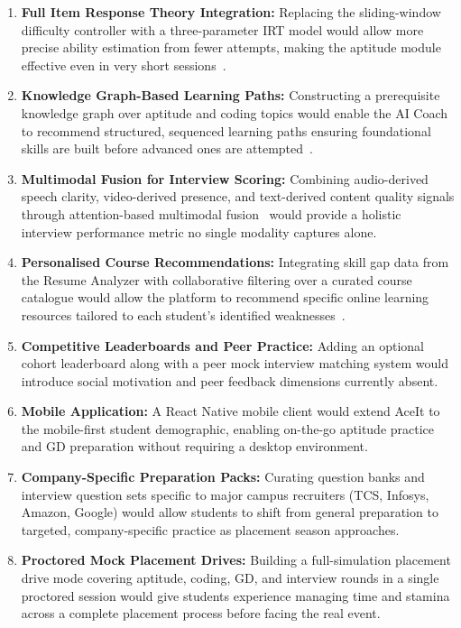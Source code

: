 \documentclass[12pt,a4paper]{report}
\begin{document}
\begin{enumerate}[leftmargin=0.5in, label=\arabic*., topsep=4pt, itemsep=3pt]
    \item \textbf{Full Item Response Theory Integration:} Replacing the sliding-window difficulty controller with a three-parameter IRT model would allow more precise ability estimation from fewer attempts, making the aptitude module effective even in very short sessions~\cite{ref1}.

    \item \textbf{Knowledge Graph-Based Learning Paths:} Constructing a prerequisite knowledge graph over aptitude and coding topics would enable the AI Coach to recommend structured, sequenced learning paths ensuring foundational skills are built before advanced ones are attempted~\cite{ref18}.

    \item \textbf{Multimodal Fusion for Interview Scoring:} Combining audio-derived speech clarity, video-derived presence, and text-derived content quality signals through attention-based multimodal fusion~\cite{ref17} would provide a holistic interview performance metric no single modality captures alone.

    \item \textbf{Personalised Course Recommendations:} Integrating skill gap data from the Resume Analyzer with collaborative filtering over a curated course catalogue would allow the platform to recommend specific online learning resources tailored to each student's identified weaknesses~\cite{ref14}.

    \item \textbf{Competitive Leaderboards and Peer Practice:} Adding an optional cohort leaderboard along with a peer mock interview matching system would introduce social motivation and peer feedback dimensions currently absent.

    \item \textbf{Mobile Application:} A React Native mobile client would extend AceIt to the mobile-first student demographic, enabling on-the-go aptitude practice and GD preparation without requiring a desktop environment.

    \item \textbf{Company-Specific Preparation Packs:} Curating question banks and interview question sets specific to major campus recruiters (TCS, Infosys, Amazon, Google) would allow students to shift from general preparation to targeted, company-specific practice as placement season approaches.

    \item \textbf{Proctored Mock Placement Drives:} Building a full-simulation placement drive mode covering aptitude, coding, GD, and interview rounds in a single proctored session would give students experience managing time and stamina across a complete placement process before facing the real event.
\end{enumerate}
\end{document}
